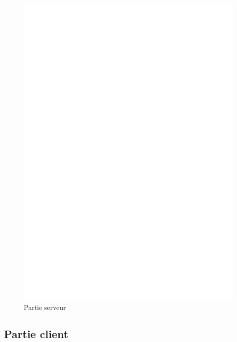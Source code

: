  \begin{figure}[htb]
   \centering
   \includegraphics[scale=.5]{img/ia.eps}
   \caption{Partie serveur}
   \label{fig:ia}
 \end{figure}

\subsection{Partie client}


